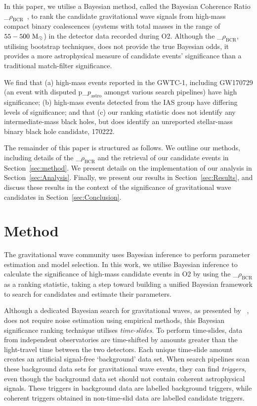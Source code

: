 \documentclass[%
 nofootinbib,
 amsmath,amssymb,
 aps,
 twocolumn
]{revtex4-2}
\newcommand{\fancytext}[1]{{\relax\ifmmode#1\else $#1$\fi}\xspace}
\newcommand{\mathcmd}[1]{{\sc \relax\ifmmode#1\else $#1$\fi}\xspace}
\newcommand{\bcr}{\mathcmd{\rho_\text{BCR}}}
\newcommand{\msun}{\mathcmd{\text{M}_\odot}}
\newcommand{\pastro}{\fancytext{p_\text{astro}}}
\begin{document}
In this paper, we utilise a Bayesian method, called the Bayesian Coherence Ratio \bcr~\cite{BCR1}, to rank the candidate gravitational wave signals from high-mass compact binary coalescences (systems with total masses in the range of $55-500\ \msun$) in the detector data recorded during O2. Although the \bcr, utilising bootstrap techniques, does not provide the true Bayesian odds, it provides a more astrophysical measure of candidate events' significance than a traditional match-filter significance.

We find that (a) high-mass events reported in the GWTC-1, including GW170729 (an event with disputed \pastro amongst various search pipelines) have high significance; (b) high-mass events detected from the IAS group have differing levels of significance; and that (c) our ranking statistic does not identify any intermediate-mass black holes, but does identify an unreported stellar-mass binary black hole candidate, 170222.

The remainder of this paper is structured as follows. We outline our methods, including details of the \bcr and the retrieval of our candidate events in Section~\ref{sec:method}. We present details on the implementation of our analysis in Section~\ref{sec:Analysis}. Finally, we present our results in Section~\ref{sec:Results}, and discuss these results in the context of the significance of gravitational wave candidates in Section~\ref{sec:Conclusion}.


\section{Method\label{sec:method}}
The gravitational wave community uses Bayesian inference to perform parameter estimation and model selection. In this work, we utilise Bayesian inference to calculate the significance of high-mass candidate events in O2 by using the \bcr as a ranking statistic, taking a step toward building a unified Bayesian framework to search for candidates and estimate their parameters.

Although a dedicated Bayesian search for gravitational waves, as presented by ~\citet{BCR2}, does not require noise estimation using empirical methods, this Bayesian significance ranking technique utilises \textit{time-slides}. To perform time-slides, data from independent observatories are time-shifted by amounts greater than the light-travel time between the two detectors. Each unique time-slide amount creates an artificial signal-free `background' data set. When search pipelines scan these background data sets for gravitational wave events, they can find \textit{triggers}\footnotemark, even though the background data set should not contain coherent astrophysical signals. These triggers in background data are labelled background triggers, while coherent triggers obtained in non-time-slid data are labelled candidate triggers.
\end{document}
